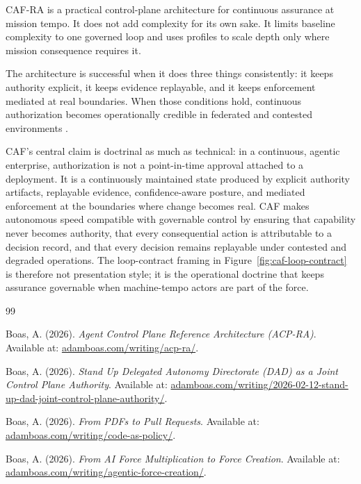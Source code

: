 \documentclass[11pt]{article}
\begin{document}
CAF-RA is a practical control-plane architecture for continuous assurance at mission tempo. It does not add complexity for its own sake. It limits baseline complexity to one governed loop and uses profiles to scale depth only where mission consequence requires it.

The architecture is successful when it does three things consistently: it keeps authority explicit, it keeps evidence replayable, and it keeps enforcement mediated at real boundaries. When those conditions hold, continuous authorization becomes operationally credible in federated and contested environments \cite{ACPRA,DADMemo}.

CAF's central claim is doctrinal as much as technical: in a continuous, agentic enterprise, authorization is not a point-in-time approval attached to a deployment. It is a continuously maintained state produced by explicit authority artifacts, replayable evidence, confidence-aware posture, and mediated enforcement at the boundaries where change becomes real. CAF makes autonomous speed compatible with governable control by ensuring that capability never becomes authority, that every consequential action is attributable to a decision record, and that every decision remains replayable under contested and degraded operations. The loop-contract framing in Figure~\ref{fig:caf-loop-contract} is therefore not presentation style; it is the operational doctrine that keeps assurance governable when machine-tempo actors are part of the force.

\begin{thebibliography}{99}

Boas, A. (2026). \textit{Agent Control Plane Reference Architecture (ACP-RA)}. Available at: \href{https://www.adamboas.com/writing/acp-ra/}{adamboas.com/writing/acp-ra/}.

Boas, A. (2026). \textit{Stand Up Delegated Autonomy Directorate (DAD) as a Joint Control Plane Authority}. Available at: \href{https://www.adamboas.com/writing/2026-02-12-stand-up-dad-joint-control-plane-authority/}{adamboas.com/writing/2026-02-12-stand-up-dad-joint-control-plane-authority/}.

Boas, A. (2026). \textit{From PDFs to Pull Requests}. Available at: \href{https://www.adamboas.com/writing/code-as-policy/}{adamboas.com/writing/code-as-policy/}.

Boas, A. (2026). \textit{From AI Force Multiplication to Force Creation}. Available at: \href{https://www.adamboas.com/writing/agentic-force-creation/}{adamboas.com/writing/agentic-force-creation/}.

\end{thebibliography}
\end{document}
